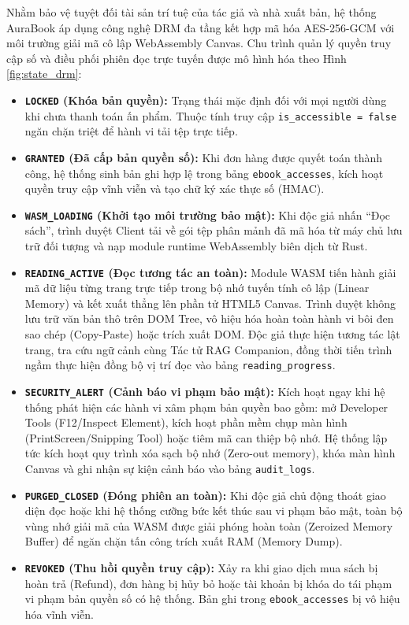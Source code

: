 \documentclass[11pt, a4paper]{report}
\begin{document}
Nhằm bảo vệ tuyệt đối tài sản trí tuệ của tác giả và nhà xuất bản, hệ thống AuraBook áp dụng công nghệ DRM đa tầng kết hợp mã hóa AES-256-GCM với môi trường giải mã cô lập WebAssembly Canvas. Chu trình quản lý quyền truy cập số và điều phối phiên đọc trực tuyến được mô hình hóa theo Hình \ref{fig:state_drm}:
\begin{itemize}
    \item \textbf{\texttt{LOCKED} (Khóa bản quyền):} Trạng thái mặc định đối với mọi người dùng khi chưa thanh toán ấn phẩm. Thuộc tính truy cập \texttt{is\_accessible = false} ngăn chặn triệt để hành vi tải tệp trực tiếp.
    \item \textbf{\texttt{GRANTED} (Đã cấp bản quyền số):} Khi đơn hàng được quyết toán thành công, hệ thống sinh bản ghi hợp lệ trong bảng \texttt{ebook\_accesses}, kích hoạt quyền truy cập vĩnh viễn và tạo chữ ký xác thực số (HMAC).
    \item \textbf{\texttt{WASM\_LOADING} (Khởi tạo môi trường bảo mật):} Khi độc giả nhấn ``Đọc sách'', trình duyệt Client tải về gói tệp phân mảnh đã mã hóa từ máy chủ lưu trữ đối tượng và nạp module runtime WebAssembly biên dịch từ Rust.
    \item \textbf{\texttt{READING\_ACTIVE} (Đọc tương tác an toàn):} Module WASM tiến hành giải mã dữ liệu từng trang trực tiếp trong bộ nhớ tuyến tính cô lập (Linear Memory) và kết xuất thẳng lên phần tử HTML5 Canvas. Trình duyệt không lưu trữ văn bản thô trên DOM Tree, vô hiệu hóa hoàn toàn hành vi bôi đen sao chép (Copy-Paste) hoặc trích xuất DOM. Độc giả thực hiện tương tác lật trang, tra cứu ngữ cảnh cùng Tác tử RAG Companion, đồng thời tiến trình ngầm thực hiện đồng bộ vị trí đọc vào bảng \texttt{reading\_progress}.
    \item \textbf{\texttt{SECURITY\_ALERT} (Cảnh báo vi phạm bảo mật):} Kích hoạt ngay khi hệ thống phát hiện các hành vi xâm phạm bản quyền bao gồm: mở Developer Tools (F12/Inspect Element), kích hoạt phần mềm chụp màn hình (PrintScreen/Snipping Tool) hoặc tiêm mã can thiệp bộ nhớ. Hệ thống lập tức kích hoạt quy trình xóa sạch bộ nhớ (Zero-out memory), khóa màn hình Canvas và ghi nhận sự kiện cảnh báo vào bảng \texttt{audit\_logs}.
    \item \textbf{\texttt{PURGED\_CLOSED} (Đóng phiên an toàn):} Khi độc giả chủ động thoát giao diện đọc hoặc khi hệ thống cưỡng bức kết thúc sau vi phạm bảo mật, toàn bộ vùng nhớ giải mã của WASM được giải phóng hoàn toàn (Zeroized Memory Buffer) để ngăn chặn tấn công trích xuất RAM (Memory Dump).
    \item \textbf{\texttt{REVOKED} (Thu hồi quyền truy cập):} Xảy ra khi giao dịch mua sách bị hoàn trả (Refund), đơn hàng bị hủy bỏ hoặc tài khoản bị khóa do tái phạm vi phạm bản quyền số có hệ thống. Bản ghi trong \texttt{ebook\_accesses} bị vô hiệu hóa vĩnh viễn.
\end{itemize}
\end{document}
